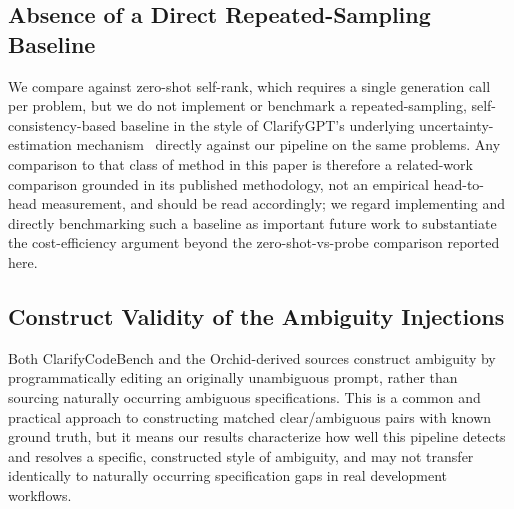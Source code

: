 \subsection{Absence of a Direct Repeated-Sampling Baseline}

We compare against zero-shot self-rank, which requires a single generation
call per problem, but we do not implement or benchmark a repeated-sampling,
self-consistency-based baseline in the style of ClarifyGPT's underlying
uncertainty-estimation mechanism~\cite{clarifygpt} directly against our
pipeline on the same problems. Any comparison to that class of method in
this paper is therefore a related-work comparison grounded in its published
methodology, not an empirical head-to-head measurement, and should be read
accordingly; we regard implementing and directly benchmarking such a
baseline as important future work to substantiate the cost-efficiency
argument beyond the zero-shot-vs-probe comparison reported here.

\subsection{Construct Validity of the Ambiguity Injections}

Both ClarifyCodeBench and the Orchid-derived sources construct ambiguity by
programmatically editing an originally unambiguous prompt, rather than
sourcing naturally occurring ambiguous specifications. This is a common and
practical approach to constructing matched clear/ambiguous pairs with known
ground truth, but it means our results characterize how well this pipeline
detects and resolves a specific, constructed style of ambiguity, and may
not transfer identically to naturally occurring specification gaps in
real development workflows.
